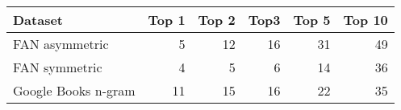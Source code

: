\begin{tabular}{lrrrrr}\hline
Dataset & Top 1 & Top 2 & Top3 & Top 5 & Top 10 \\
\hline
FAN asymmetric & 5 & 12 & 16 & 31 & 49 \\
FAN symmetric & 4 & 5 & 6 & 14 & 36 \\
Google Books n-gram & 11 & 15 & 16 & 22 & 35 \\
\hline
\end{tabular}
